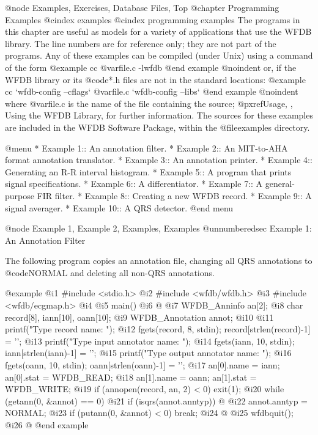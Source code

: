 {{{{{{{{{{@node Examples, Exercises, Database Files, Top
@chapter Programming Examples
@cindex examples
@cindex programming examples
The programs in this chapter are useful as models for a variety of
applications that use the WFDB library.  The line numbers are for
reference only; they are not part of the programs.  Any of these
examples can be compiled (under Unix) using a command of the form
@example
cc @var{file.c} -lwfdb
@end example
@noindent
or, if the WFDB library or its @code{*.h} files are not in the standard
locations:
@example
cc `wfdb-config --cflags` @var{file.c} `wfdb-config --libs`
@end example
@noindent
where @var{file.c} is the name of the file containing the source;
@pxref{Usage, , Using the WFDB Library}, for further information.
The sources for these examples are included in the WFDB Software Package,
within the @file{examples} directory.

@menu
* Example 1::			An annotation filter.
* Example 2::			An MIT-to-AHA format annotation translator.
* Example 3::			An annotation printer.
* Example 4::			Generating an R-R interval histogram.
* Example 5::			A program that prints signal specifications.
* Example 6::			A differentiator.
* Example 7::			A general-purpose FIR filter.
* Example 8::			Creating a new WFDB record.
* Example 9::			A signal averager.
* Example 10::			A QRS detector.
@end menu

@node     Example 1, Example 2, Examples, Examples
@unnumberedsec Example 1:  An Annotation Filter

The following program copies an annotation file, changing all QRS annotations
to @code{NORMAL} and deleting all non-QRS annotations.

@example
 @i{1}  #include <stdio.h>
 @i{2}  #include <wfdb/wfdb.h>
 @i{3}  #include <wfdb/ecgmap.h>
 @i{4}
 @i{5}  main()
 @i{6}  @{
 @i{7}      WFDB_Anninfo an[2];
 @i{8}      char record[8], iann[10], oann[10];
 @i{9}      WFDB_Annotation annot;
@i{10}
@i{11}      printf("Type record name: ");
@i{12}      fgets(record, 8, stdin); record[strlen(record)-1] = '\0';
@i{13}      printf("Type input annotator name: ");
@i{14}      fgets(iann, 10, stdin); iann[strlen(iann)-1] = '\0';
@i{15}      printf("Type output annotator name: ");
@i{16}      fgets(oann, 10, stdin); oann[strlen(oann)-1] = '\0';
@i{17}      an[0].name = iann; an[0].stat = WFDB_READ;
@i{18}      an[1].name = oann; an[1].stat = WFDB_WRITE;
@i{19}      if (annopen(record, an, 2) < 0) exit(1);
@i{20}      while (getann(0, &annot) == 0)
@i{21}          if (isqrs(annot.anntyp)) @{
@i{22}              annot.anntyp = NORMAL;
@i{23}              if (putann(0, &annot) < 0) break;
@i{24}          @}
@i{25}      wfdbquit();
@i{26}  @}
@end example

}}}}}}}}}}
